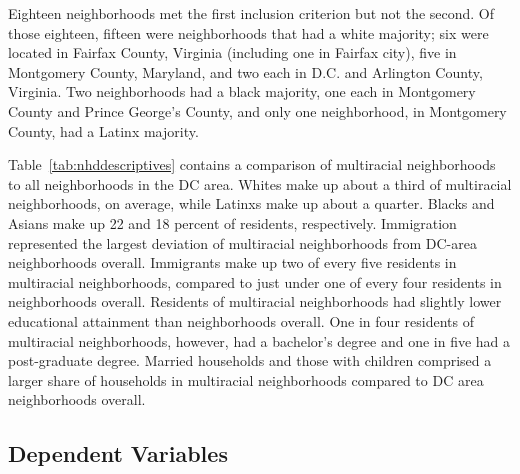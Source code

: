 \documentclass{baderart}
\begin{document}
Eighteen neighborhoods met the first inclusion criterion but not the second. Of those eighteen, fifteen were neighborhoods that had a white majority; six were located in Fairfax County, Virginia (including one in Fairfax city), five in Montgomery County, Maryland, and two each in D.C. and Arlington County, Virginia. Two neighborhoods had a black majority, one each in Montgomery County and Prince George's County, and only one neighborhood, in Montgomery County, had a Latinx majority.

Table~\ref{tab:nhddescriptives} contains a comparison of multiracial neighborhoods to all neighborhoods in the DC area. Whites make up about a third of multiracial neighborhoods, on average, while Latinxs make up about a quarter. Blacks and Asians make up 22 and 18 percent of residents, respectively. Immigration represented the largest deviation of multiracial neighborhoods from DC-area neighborhoods overall. Immigrants make up two of every five residents in multiracial neighborhoods, compared to just under one of every four residents in neighborhoods overall. Residents of multiracial neighborhoods had slightly lower educational attainment than neighborhoods overall. One in four residents of multiracial neighborhoods, however, had a bachelor's degree and one in five had a post-graduate degree. Married households and those with children comprised a larger share of households in multiracial neighborhoods compared to DC area neighborhoods overall.



\subsection{Dependent Variables}\label{dependent-variables}
\end{document}
